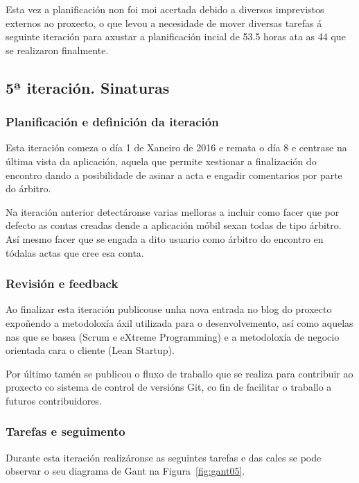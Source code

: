       Esta vez a planificación non foi moi acertada debido a diversos 
imprevistos externos ao proxecto, o que levou a necesidade de mover diversas 
tarefas á seguinte iteración para axustar a planificación incial de 53.5 horas 
ata as 44 que se realizaron finalmente.

    \subsection{5ª iteración. Sinaturas}

      \subsubsection{Planificación e definición da iteración}
      Esta iteración comeza o día 1 de Xaneiro de 2016 e remata o día 8 
e centrase na última vista da aplicación, aquela que permite xestionar a 
finalización do encontro dando a posibilidade de asinar a acta e engadir 
comentarios por parte do árbitro.

      Na iteración anterior detectáronse varias melloras a incluir como facer 
que por defecto as contas creadas dende a aplicación móbil sexan todas de tipo 
árbitro. Así mesmo facer que se engada a dito usuario como árbitro do encontro 
en tódalas actas que cree esa conta.

      \subsubsection{Revisión e feedback}
      Ao finalizar esta iteración publicouse unha nova entrada no blog do 
proxecto expoñendo a metodoloxía áxil utilizada para o desenvolvemento, así 
como aquelas nas que se basea (Scrum e eXtreme Programming) e a metodoloxía de 
negocio orientada cara o cliente (Lean Startup).

      Por último tamén se publicou o fluxo de traballo que se realiza para 
contribuir ao proxecto co sistema de control de versións Git, co fin de 
facilitar o traballo a futuros contribuidores.

      \subsubsection{Tarefas e seguimento}

      Durante esta iteración realizáronse as seguintes tarefas e das cales se 
pode observar o seu diagrama de Gant na Figura~\ref{fig:gant05}.

